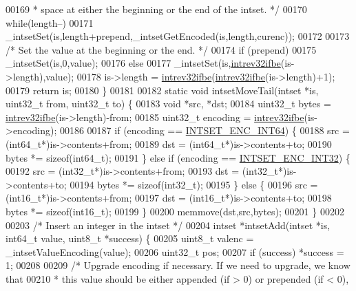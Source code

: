 \begin{DoxyCode}
00169 \textcolor{comment}{     * space at either the beginning or the end of the intset. */}
00170     \textcolor{keywordflow}{while}(length--)
00171         \_intsetSet(is,length+prepend,\_intsetGetEncoded(is,length,curenc));
00172 
00173     \textcolor{comment}{/* Set the value at the beginning or the end. */}
00174     \textcolor{keywordflow}{if} (prepend)
00175         \_intsetSet(is,0,value);
00176     \textcolor{keywordflow}{else}
00177         \_intsetSet(is,\hyperlink{endianconv_8h_a4e85d9ae58a3b1e6ceaabfd4689002c7}{intrev32ifbe}(is->length),value);
00178     is->length = \hyperlink{endianconv_8h_a4e85d9ae58a3b1e6ceaabfd4689002c7}{intrev32ifbe}(\hyperlink{endianconv_8h_a4e85d9ae58a3b1e6ceaabfd4689002c7}{intrev32ifbe}(is->length)+1);
00179     \textcolor{keywordflow}{return} is;
00180 \}
00181 
00182 \textcolor{keyword}{static} \textcolor{keywordtype}{void} intsetMoveTail(intset *is, uint32\_t from, uint32\_t to) \{
00183     \textcolor{keywordtype}{void} *src, *dst;
00184     uint32\_t bytes = \hyperlink{endianconv_8h_a4e85d9ae58a3b1e6ceaabfd4689002c7}{intrev32ifbe}(is->length)-from;
00185     uint32\_t encoding = \hyperlink{endianconv_8h_a4e85d9ae58a3b1e6ceaabfd4689002c7}{intrev32ifbe}(is->encoding);
00186 
00187     \textcolor{keywordflow}{if} (encoding == \hyperlink{intset_8c_a813ff1fc109e585be5fef8f605101064}{INTSET\_ENC\_INT64}) \{
00188         src = (int64\_t*)is->contents+from;
00189         dst = (int64\_t*)is->contents+to;
00190         bytes *= \textcolor{keyword}{sizeof}(int64\_t);
00191     \} \textcolor{keywordflow}{else} \textcolor{keywordflow}{if} (encoding == \hyperlink{intset_8c_aa1aa222f55313754dadfb15b2a328f6b}{INTSET\_ENC\_INT32}) \{
00192         src = (int32\_t*)is->contents+from;
00193         dst = (int32\_t*)is->contents+to;
00194         bytes *= \textcolor{keyword}{sizeof}(int32\_t);
00195     \} \textcolor{keywordflow}{else} \{
00196         src = (int16\_t*)is->contents+from;
00197         dst = (int16\_t*)is->contents+to;
00198         bytes *= \textcolor{keyword}{sizeof}(int16\_t);
00199     \}
00200     memmove(dst,src,bytes);
00201 \}
00202 
00203 \textcolor{comment}{/* Insert an integer in the intset */}
00204 intset *intsetAdd(intset *is, int64\_t value, uint8\_t *success) \{
00205     uint8\_t valenc = \_intsetValueEncoding(value);
00206     uint32\_t pos;
00207     \textcolor{keywordflow}{if} (success) *success = 1;
00208 
00209     \textcolor{comment}{/* Upgrade encoding if necessary. If we need to upgrade, we know that}
00210 \textcolor{comment}{     * this value should be either appended (if > 0) or prepended (if < 0),}

\end{DoxyCode}
